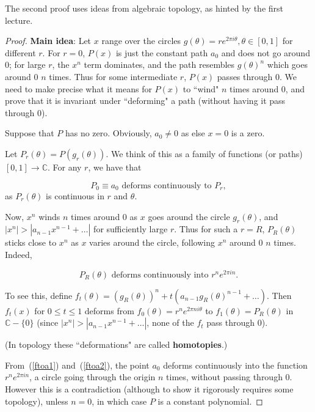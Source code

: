 The second proof uses ideas from algebraic topology, as hinted by the first lecture.
\begin{proof}

\textbf{Main idea}: Let $ x$ range over the circles $ g(\theta)=re^{2\pi i\theta}, \theta\in[0,1]$ for different $ r$. For $ r=0$, $ P(x)$ is just the constant path $ a_0$ and does not go around 0; for large $ r$, the $ x^n$ term dominates, and the path resembles $ g(\theta)^n$ which goes around 0 $ n$ times. Thus for some intermediate $r$, $ P(x)$ passes through 0. We need to make precise what it means for $ P(x)$ to ``wind" $ n$ times around 0, and prove that it is invariant under ``deforming" a path (without having it pass through 0).


Suppose that $ P$ has no zero. Obviously, $ a_0\neq 0$ as else $ x=0$ is a zero.

Let $ P_r(\theta)=P(g_r(\theta))$. We think of this as a family of functions (or paths) $ [0,1]\to \mathbb{C}$. For any $ r$, we have that

\begin{equation}\label{ftoa1}P_0\equiv a_0\text{ deforms continuously to } P_r,\end{equation}
as $ P_r(\theta)$ is continuous in $r$ and $ \theta$. 

Now, $ x^n$ winds $ n$ times around 0 as $ x$ goes around the circle $ g_r(\theta)$, and $ |x^n|> |a_{n-1}x^{n-1}+\ldots|$ for sufficiently large $ r$. Thus for such a $ r=R$, $ P_R(\theta)$ sticks close to $ x^n$ as $ x$ varies around the circle, following $ x^n$ around 0 $ n$ times. Indeed,

\begin{equation}\label{ftoa2}P_R(\theta)\text{ deforms continuously into } r^ne^{2\pi in}.\end{equation}

To see this, define $ f_t(\theta)=(g_R(\theta))^n+t (a_{n-1}g_R(\theta)^{n-1}+\ldots)$. Then $ f_t(x)$ for $ 0\leq t\leq 1$ deforms from $ f_0(\theta)=r^ne^{2\pi n i\theta}$ to $ f_1(\theta)=P_R(\theta)$ in $ \mathbb{C}-\{0\}$ (since $ |x^n|> |a_{n-1}x^{n-1}+\ldots|$, none of the $ f_t$ pass through 0).

(In topology these ``deformations" are called \textbf{homotopies}.)

From~(\ref{ftoa1}) and~(\ref{ftoa2}), the point $ a_0$ deforms continuously into the function $ r^ne^{2\pi in}$, a circle going through the origin $n$ times, without passing through 0. However this is a contradiction (although to show it rigorously requires some topology), unless $n=0$, in which case $P$ is a constant polynomial.


\end{proof}
